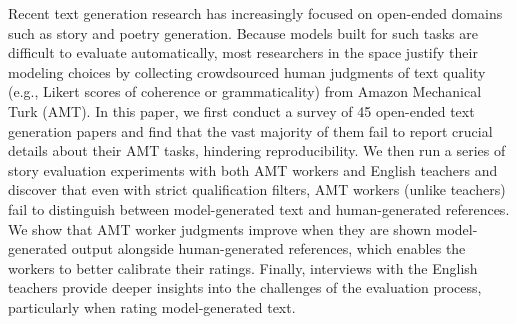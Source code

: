 Recent text generation research has increasingly focused on open-ended domains such as story and poetry generation. Because models built for such tasks are difficult to evaluate automatically, most researchers in the space justify their modeling choices by collecting crowdsourced human judgments of text quality (e.g., Likert scores of coherence or grammaticality) from Amazon Mechanical Turk (AMT). In this paper, we first conduct a survey of 45 open-ended text generation papers and find that the vast majority of them fail to report crucial details about their AMT tasks, hindering reproducibility. We then run a series of story evaluation experiments with both AMT workers and English teachers and discover that even with strict qualification filters, AMT workers (unlike teachers) fail to distinguish between model-generated text and human-generated references. We show that AMT worker judgments improve when they are shown model-generated output alongside human-generated references, which enables the workers to better calibrate their ratings. Finally, interviews with the English teachers provide deeper insights into the challenges of the evaluation process, particularly when rating model-generated text.
